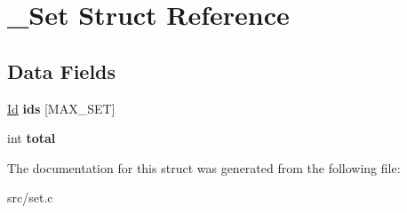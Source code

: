 \hypertarget{struct__Set}{}\section{\+\_\+\+Set Struct Reference}
\label{struct__Set}
\subsection*{Data Fields}
\begin{DoxyCompactItemize}
\item 
\mbox{\label{struct__Set_a3b2034bbfee5ca2b0dde5b6073c264cc}} 
\hyperlink{types_8h_a845e604fb28f7e3d97549da3448149d3}{Id} {\bfseries ids} \mbox{[}M\+A\+X\+\_\+\+S\+ET\mbox{]}
\item 
\mbox{\label{struct__Set_a9ae5f2cab9df62f0a98dd683be804878}} 
int {\bfseries total}
\end{DoxyCompactItemize}


The documentation for this struct was generated from the following file\+:\begin{DoxyCompactItemize}
\item 
src/set.\+c\end{DoxyCompactItemize}
